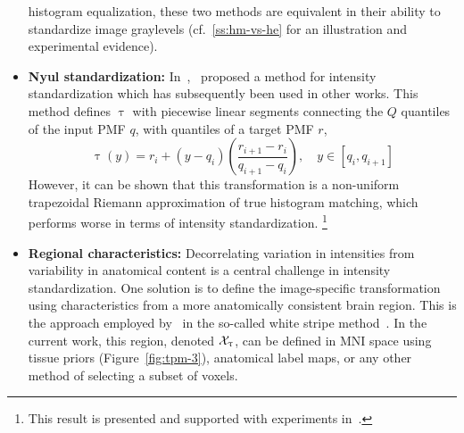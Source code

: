 \begin{itemize}
  histogram equalization, these two methods are equivalent in their ability
  to standardize image graylevels
  (cf.~\ref{ss:hm-vs-he} for an illustration and experimental evidence).
  \item \textbf{Nyul standardization:}
  In~\cite{Nyul1999,Nyul2000},~\citeauthor{Nyul1999} proposed a method for
  intensity standardization which has subsequently been used in other works. %
  This method defines $\uptau$ with piecewise linear segments
  connecting the $Q$ quantiles of the input PMF $q$, with quantiles of a target PMF $r$,
  \begin{equation}
    \uptau(y) = r_i + \left(y-q_i\right)
      \left(\frac{r_{i+1}-r_i}{q_{i+1}-q_i}\right),\quad y\in[q_i,q_{i+1}]
    \end{equation}
  However, it can be shown that this transformation is
  a non-uniform trapezoidal Riemann approximation of true histogram matching,
  which performs worse in terms of intensity standardization.%
  \footnote{This result is presented and supported with experiments in~\cite{Knight2017}.} %
  \item \textbf{Regional characteristics:}
  Decorrelating variation in intensities from variability in anatomical content
  is a central challenge in intensity standardization.
  One solution is to define the image-specific transformation using characteristics
  from a more anatomically consistent brain region.
  This is the approach employed by~\citeauthor{Shinohara2014}
  in the so-called white stripe method~\cite{Shinohara2014}.
  In the current work, this region, denoted $\mathcal{X}_{\uptau}$,
  can be defined in MNI space using tissue priors (Figure~\ref{fig:tpm-3}),
  anatomical label maps, or any other method of selecting a subset of voxels.
\end{itemize}
